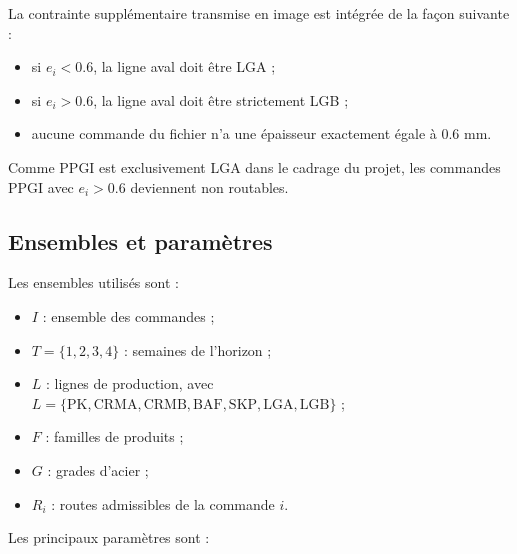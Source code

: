 \documentclass[12pt,a4paper]{article}
\begin{document}
La contrainte supplémentaire transmise en image est intégrée de la façon suivante :

\begin{itemize}
    \item si $e_i < 0.6$, la ligne aval doit être LGA ;
    \item si $e_i > 0.6$, la ligne aval doit être strictement LGB ;
    \item aucune commande du fichier n'a une épaisseur exactement égale à 0.6 mm.
\end{itemize}

Comme PPGI est exclusivement LGA dans le cadrage du projet, les commandes PPGI avec $e_i > 0.6$ deviennent non routables.

\subsection{Ensembles et paramètres}

Les ensembles utilisés sont :

\begin{itemize}
    \item $I$ : ensemble des commandes ;
    \item $T=\{1,2,3,4\}$ : semaines de l'horizon ;
    \item $L$ : lignes de production, avec $L=\{\text{PK},\text{CRMA},\text{CRMB},\text{BAF},\text{SKP},\text{LGA},\text{LGB}\}$ ;
    \item $F$ : familles de produits ;
    \item $G$ : grades d'acier ;
    \item $R_i$ : routes admissibles de la commande $i$.
\end{itemize}

Les principaux paramètres sont :
\end{document}
